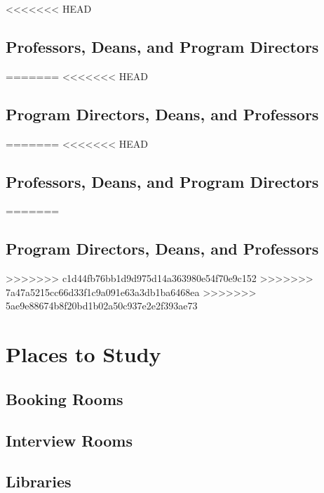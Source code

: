 \documentclass[
]{book}
\begin{document}
<<<<<<< HEAD
\hypertarget{professors-deans-and-program-directors}{%
\section{Professors, Deans, and Program Directors}\label{professors-deans-and-program-directors}}
=======
<<<<<<< HEAD
\hypertarget{program-directors-deans-and-professors}{%
\section{Program Directors, Deans, and Professors}\label{program-directors-deans-and-professors}}
=======
<<<<<<< HEAD
\hypertarget{professors-deans-and-program-directors}{%
\section{Professors, Deans, and Program Directors}\label{professors-deans-and-program-directors}}
=======
\hypertarget{program-directors-deans-and-professors}{%
\section{Program Directors, Deans, and Professors}\label{program-directors-deans-and-professors}}
>>>>>>> c1d44fb76bb1d9d975d14a363980e54f70e9c152
>>>>>>> 7a47a5215cc66d33f1c9a091e63a3db1ba6468ea
>>>>>>> 5ae9e88674b8f20bd1b02a50c937e2e2f393ae73

\hypertarget{places-to-study}{%
\chapter{Places to Study}\label{places-to-study}}

\hypertarget{booking-rooms}{%
\section{Booking Rooms}\label{booking-rooms}}

\hypertarget{interview-rooms}{%
\section{Interview Rooms}\label{interview-rooms}}

\hypertarget{libraries}{%
\section{Libraries}\label{libraries}}
\end{document}
